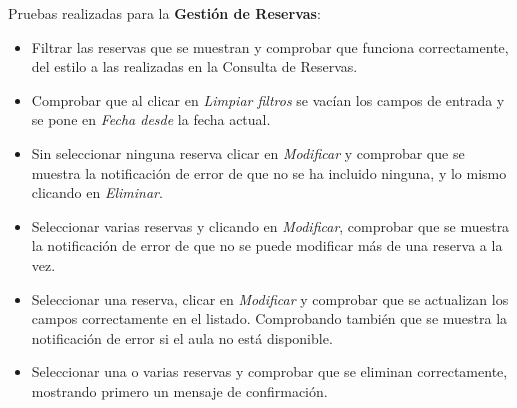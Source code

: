 Pruebas realizadas para la \textbf{Gestión de Reservas}:
\begin{itemize}
    \item Filtrar las reservas que se muestran y comprobar que funciona correctamente, del estilo a las realizadas en la Consulta de Reservas.
    \item Comprobar que al clicar en \textit{Limpiar filtros} se vacían los campos de entrada y se pone en \textit{Fecha desde} la fecha actual.
    \item Sin seleccionar ninguna reserva clicar en \textit{Modificar} y comprobar que se muestra la notificación de error de que no se ha incluido ninguna, y lo mismo clicando en \textit{Eliminar}.
    \item Seleccionar varias reservas y clicando en \textit{Modificar}, comprobar que se muestra la notificación de error de que no se puede modificar más de una reserva a la vez.
    \item Seleccionar una reserva, clicar en \textit{Modificar} y comprobar que se actualizan los campos correctamente en el listado. Comprobando también que se muestra la notificación de error si el aula no está disponible.
    \item Seleccionar una o varias reservas y comprobar que se eliminan correctamente, mostrando primero un mensaje de confirmación.
\end{itemize}